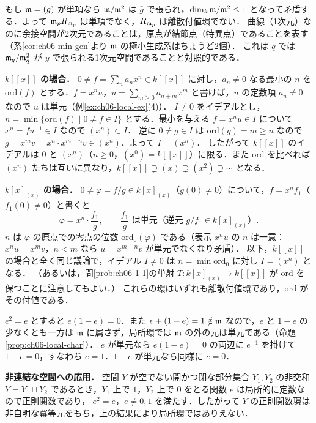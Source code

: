 もし $\mathfrak{m}=(g)$ が単項なら $\mathfrak{m}/\mathfrak{m}^2$ は $\bar g$ で張られ，$\dim_k\mathfrak{m}/\mathfrak{m}^2\le1$ となって矛盾する．よって $\mathfrak{m}_pR_{\mathfrak{m}_p}$ は単項でなく，$R_{\mathfrak{m}_p}$ は離散付値環でない．
曲線（1次元）なのに余接空間が2次元であることは，原点が結節点（特異点）であることを表す（系\ref{cor:ch06-min-gen}より $\mathfrak{m}$ の極小生成系はちょうど2個）．
これは $q$ では $\mathfrak{m}_q/\mathfrak{m}_q^2$ が $\bar y$ で張られる1次元空間であることと対照的である．

\textbf{$k[[x]]$ の場合．}
$0\ne f=\sum_{n}a_nx^n\in k[[x]]$ に対し，$a_n\ne0$ なる最小の $n$ を $\mathrm{ord}(f)$ とする．$f=x^n u$，$u=\sum_{m\ge0}a_{n+m}x^m$ と書けば，$u$ の定数項 $a_n\ne0$ なので $u$ は単元（例\ref{ex:ch06-local-ex}(4)）．
$I\ne0$ をイデアルとし，$n=\min\{\mathrm{ord}(f)\mid0\ne f\in I\}$ とする．最小を与える $f=x^nu\in I$ について $x^n=fu^{-1}\in I$ なので $(x^n)\subset I$．
逆に $0\ne g\in I$ は $\mathrm{ord}(g)=m\ge n$ なので $g=x^mv=x^n\cdot x^{m-n}v\in(x^n)$．よって $I=(x^n)$．
したがって $k[[x]]$ のイデアルは $0$ と $(x^n)$（$n\ge0$，$(x^0)=k[[x]]$）に限る．また $\mathrm{ord}$ を比べれば $(x^n)$ たちは互いに異なり，$k[[x]]\supsetneq(x)\supsetneq(x^2)\supsetneq\cdots$ となる．

\textbf{$k[x]_{(x)}$ の場合．}
$0\ne\varphi=f/g\in k[x]_{(x)}$（$g(0)\ne0$）について，$f=x^nf_1$（$f_1(0)\ne0$）と書くと
\[
  \varphi=x^n\cdot\frac{f_1}{g},\qquad \frac{f_1}{g}\text{ は単元（逆元 }g/f_1\in k[x]_{(x)}\text{）}.
\]
$n$ は $\varphi$ の原点での零点の位数 $\mathrm{ord}_0(\varphi)$ である（表示 $x^nu$ の $n$ は一意：$x^nu=x^mv$，$n<m$ なら $u=x^{m-n}v$ が単元でなくなり矛盾）．
以下，$k[[x]]$ の場合と全く同じ議論で，イデアル $I\ne0$ は $n=\min\mathrm{ord}_0$ に対し $I=(x^n)$ となる．
（あるいは，問\ref{prob:ch06-1-1}の単射 $T\colon k[x]_{(x)}\to k[[x]]$ が $\mathrm{ord}$ を保つことに注意してもよい．）
これらの環はいずれも離散付値環であり，$\mathrm{ord}$ がその付値である．

$e^2=e$ とすると $e(1-e)=0$．また $e+(1-e)=1\notin\mathfrak{m}$ なので，$e$ と $1-e$ の少なくとも一方は $\mathfrak{m}$ に属さず，局所環では $\mathfrak{m}$ の外の元は単元である（命題\ref{prop:ch06-local-char}）．
$e$ が単元なら $e(1-e)=0$ の両辺に $e^{-1}$ を掛けて $1-e=0$，すなわち $e=1$．$1-e$ が単元なら同様に $e=0$．

\textbf{非連結な空間への応用．}
空間 $Y$ が空でない開かつ閉な部分集合 $Y_1,Y_2$ の非交和 $Y=Y_1\sqcup Y_2$ であるとき，$Y_1$ 上で $1$，$Y_2$ 上で $0$ をとる関数 $e$ は局所的に定数なので正則関数であり，
$e^2=e$，$e\ne0,1$ を満たす．したがって $Y$ の正則関数環は非自明な冪等元をもち，上の結果により局所環ではありえない．

